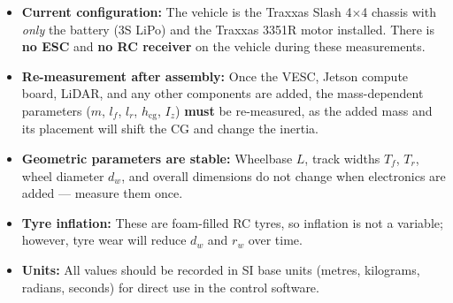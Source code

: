 \documentclass[a4paper,11pt]{article}
\begin{document}
\begin{itemize}
  \item \textbf{Current configuration:}  The vehicle is the Traxxas
        Slash 4$\times$4 chassis with \emph{only} the battery (3S LiPo)
        and the Traxxas 3351R motor installed.  There is \textbf{no ESC}
        and \textbf{no RC receiver} on the vehicle during these
        measurements.
  \item \textbf{Re-measurement after assembly:}  Once the VESC, Jetson
        compute board, LiDAR, and any other components are added, the
        mass-dependent parameters ($m$, $l_f$, $l_r$, $h_\text{cg}$,
        $I_z$) \textbf{must} be re-measured, as the added mass and its
        placement will shift the CG and change the inertia.
  \item \textbf{Geometric parameters are stable:}  Wheelbase $L$, track
        widths $T_f$, $T_r$, wheel diameter $d_w$, and overall
        dimensions do not change when electronics are added — measure
        them once.
  \item \textbf{Tyre inflation:}  These are foam-filled RC tyres, so
        inflation is not a variable; however, tyre wear will reduce
        $d_w$ and $r_w$ over time.
  \item \textbf{Units:}  All values should be recorded in SI base units
        (metres, kilograms, radians, seconds) for direct use in the
        control software.
\end{itemize}
\end{document}
